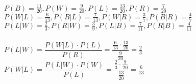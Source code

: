 \documentclass{../Vorlage/mat}
\begin{document}
$P(B) = \frac{11}{20}, P(W) = \frac{9}{20}, P(L) = \frac{13}{20}, P(R) = \frac{7}{20}$\\
$P(W|L) = \frac{6}{13}, P(B|L) = \frac{7}{13}, P(W|R) = \frac{3}{7}, P(B|R) = \frac{4}{7}$\\
$P(L|W) = \frac{2}{3}, P(R|W) = \frac{3}{9}, P(L|B) = \frac{7}{11}, P(R|B) = \frac{4}{11}$\\
\\
$P(L|W) = \dfrac{P(W|L) \cdot P(L)}{P(R)} = \dfrac{\frac{6}{13} \cdot \frac{13}{20}}{\frac{9}{20}} = \frac{2}{3}$\\
$P(W|L) = \dfrac{P(L|W) \cdot P(W)}{P(L)} = \dfrac{\frac{2}{3} \cdot \frac{9}{20}}{\frac{13}{20}} = \frac{6}{13}$
\end{document}
